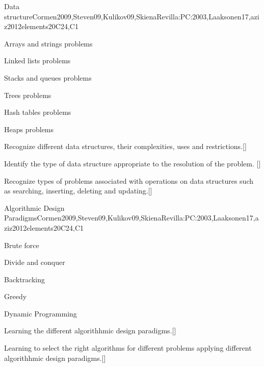\begin{syllabus}
  \begin{unit}{Data structure}{}{Cormen2009,Steven09,Kulikov09,SkienaRevilla:PC:2003,Laaksonen17,aziz2012elements}{20}{C24,C1}
    \begin{topics}
      \item Arrays and strings problems
      \item Linked lists problems
      \item Stacks and queues problems
      \item Trees problems
      \item Hash tables problems
      \item Heaps problems
    \end{topics}
    \begin{learningoutcomes}
        \item Recognize different data structures, their complexities, uses and restrictions.[\Usage]
        \item Identify the type of data structure appropriate to the resolution of the problem. [\Usage]
        \item Recognize types of problems associated with operations on data structures such as searching, inserting, deleting and updating.[\Usage]
    \end{learningoutcomes}
  \end{unit}
  
  \begin{unit}{Algorithmic Design Paradigms}{}{Cormen2009,Steven09,Kulikov09,SkienaRevilla:PC:2003,Laaksonen17,aziz2012elements}{20}{C24,C1}
    \begin{topics}
      \item Brute force
      \item Divide and conquer
      \item Backtracking
      \item Greedy
      \item Dynamic Programming
    \end{topics}
    \begin{learningoutcomes}
        \item Learning the different algorithhmic design paradigms.[\Usage]   
        \item Learning to select the right algorithms for different problems applying different algorithhmic design paradigms.[\Usage]
    \end{learningoutcomes}
  \end{unit}
  

\end{syllabus}
